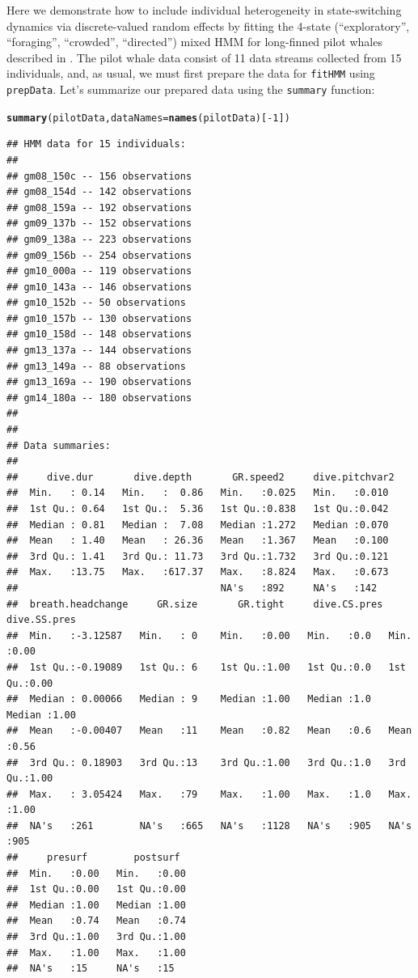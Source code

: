 \documentclass[12pt]{article}\usepackage[]{graphicx}\usepackage[]{xcolor}
\makeatletter
\newcommand{\hlnum}[1]{\textcolor[rgb]{0.686,0.059,0.569}{#1}}%
\newcommand{\hlopt}[1]{\textcolor[rgb]{0,0,0}{#1}}%
\newcommand{\hlstd}[1]{\textcolor[rgb]{0.345,0.345,0.345}{#1}}%
\newcommand{\hlkwc}[1]{\textcolor[rgb]{0.333,0.667,0.333}{#1}}%
\newcommand{\hlkwd}[1]{\textcolor[rgb]{0.737,0.353,0.396}{\textbf{#1}}}%
\newenvironment{kframe}{%
 \def\at@end@of@kframe{}%
 \ifinner\ifhmode%
  \def\at@end@of@kframe{\end{minipage}}%
  \begin{minipage}{\columnwidth}%
 \fi\fi%
 \def\FrameCommand##1{\hskip\@totalleftmargin \hskip-\fboxsep
 \colorbox{shadecolor}{##1}\hskip-\fboxsep
     \hskip-\linewidth \hskip-\@totalleftmargin \hskip\columnwidth}%
 \MakeFramed {\advance\hsize-\width
   \@totalleftmargin\z@ \linewidth\hsize
   \@setminipage}}%
 {\par\unskip\endMakeFramed%
 \at@end@of@kframe}
\newenvironment{knitrout}{}{} %
\makeatother
\begin{document}
Here we demonstrate how to include individual heterogeneity in state-switching dynamics via discrete-valued random effects by fitting the 4-state (``exploratory'', ``foraging'', ``crowded'', ``directed'') mixed HMM for long-finned pilot whales described in \cite{IsojunnoEtAl2017}.  The pilot whale data consist of 11 data streams collected from 15 individuals, and, as usual, we must first prepare the data for \verb|fitHMM| using \verb|prepData|. Let's summarize our prepared data using the \verb|summary| function:
\begin{knitrout}
\color{fgcolor}\begin{kframe}
\begin{alltt}
\hlkwd{summary}\hlstd{(pilotData,} \hlkwc{dataNames}\hlstd{=}\hlkwd{names}\hlstd{(pilotData)[}\hlopt{-}\hlnum{1}\hlstd{])}
\end{alltt}
\begin{verbatim}
## HMM data for 15 individuals:
## 
## gm08_150c -- 156 observations
## gm08_154d -- 142 observations
## gm08_159a -- 192 observations
## gm09_137b -- 152 observations
## gm09_138a -- 223 observations
## gm09_156b -- 254 observations
## gm10_000a -- 119 observations
## gm10_143a -- 146 observations
## gm10_152b -- 50 observations
## gm10_157b -- 130 observations
## gm10_158d -- 148 observations
## gm13_137a -- 144 observations
## gm13_149a -- 88 observations
## gm13_169a -- 190 observations
## gm14_180a -- 180 observations
## 
## 
## Data summaries:
## 
##     dive.dur       dive.depth       GR.speed2     dive.pitchvar2 
##  Min.   : 0.14   Min.   :  0.86   Min.   :0.025   Min.   :0.010  
##  1st Qu.: 0.64   1st Qu.:  5.36   1st Qu.:0.838   1st Qu.:0.042  
##  Median : 0.81   Median :  7.08   Median :1.272   Median :0.070  
##  Mean   : 1.40   Mean   : 26.36   Mean   :1.367   Mean   :0.100  
##  3rd Qu.: 1.41   3rd Qu.: 11.73   3rd Qu.:1.732   3rd Qu.:0.121  
##  Max.   :13.75   Max.   :617.37   Max.   :8.824   Max.   :0.673  
##                                   NA's   :892     NA's   :142    
##  breath.headchange     GR.size       GR.tight     dive.CS.pres  dive.SS.pres 
##  Min.   :-3.12587   Min.   : 0    Min.   :0.00   Min.   :0.0   Min.   :0.00  
##  1st Qu.:-0.19089   1st Qu.: 6    1st Qu.:1.00   1st Qu.:0.0   1st Qu.:0.00  
##  Median : 0.00066   Median : 9    Median :1.00   Median :1.0   Median :1.00  
##  Mean   :-0.00407   Mean   :11    Mean   :0.82   Mean   :0.6   Mean   :0.56  
##  3rd Qu.: 0.18903   3rd Qu.:13    3rd Qu.:1.00   3rd Qu.:1.0   3rd Qu.:1.00  
##  Max.   : 3.05424   Max.   :79    Max.   :1.00   Max.   :1.0   Max.   :1.00  
##  NA's   :261        NA's   :665   NA's   :1128   NA's   :905   NA's   :905   
##     presurf        postsurf   
##  Min.   :0.00   Min.   :0.00  
##  1st Qu.:0.00   1st Qu.:0.00  
##  Median :1.00   Median :1.00  
##  Mean   :0.74   Mean   :0.74  
##  3rd Qu.:1.00   3rd Qu.:1.00  
##  Max.   :1.00   Max.   :1.00  
##  NA's   :15     NA's   :15
\end{verbatim}
\end{kframe}
\end{knitrout}
\end{document}
